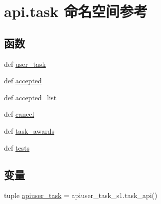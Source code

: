 \hypertarget{namespaceapi_1_1task}{\section{api.\-task 命名空间参考}
\label{namespaceapi_1_1task}
}
\subsection*{函数}
\begin{DoxyCompactItemize}
\item 
def \hyperlink{namespaceapi_1_1task_adea6ec6cbae7bc32f8c11ce0876d44ba}{user\-\_\-task}
\item 
def \hyperlink{namespaceapi_1_1task_a8b9e2bf90a9e446e1899e737946fe57a}{accepted}
\item 
def \hyperlink{namespaceapi_1_1task_a31b1b846ed46cb48627ad64d8cc4f6e0}{accepted\-\_\-list}
\item 
def \hyperlink{namespaceapi_1_1task_a6682b36d61771b2cc92bd92643ce625e}{cancel}
\item 
def \hyperlink{namespaceapi_1_1task_a8e1b59ae2190a9a8fee61e2ce951ebe7}{task\-\_\-awards}
\item 
def \hyperlink{namespaceapi_1_1task_a6b2513754a71c52e86dc24afc39692f6}{tests}
\end{DoxyCompactItemize}
\subsection*{变量}
\begin{DoxyCompactItemize}
\item 
tuple \hyperlink{namespaceapi_1_1task_af0e5bba380e9fbfe39ba9bcbef437c98}{apiuser\-\_\-task} = apiuser\-\_\-task\-\_\-s1.\-task\-\_\-api()
\end{DoxyCompactItemize}


